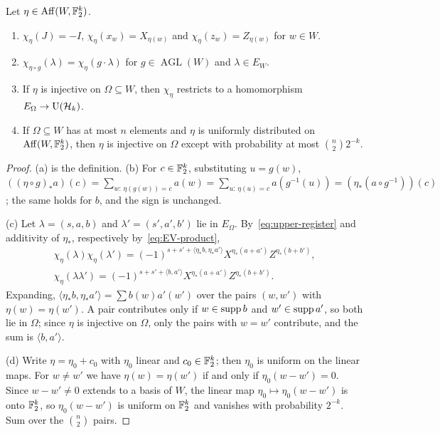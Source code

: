 \begin{lemma}\label{lem:pauli-hash}
Let $\eta\in\operatorname{Aff}(W,\mathbb F_2^k)$.
\begin{enumerate}[label=(\alph*),itemsep=1pt]
\item $\chi_\eta(J)=-I$, $\chi_\eta(x_w)=X_{\eta(w)}$ and $\chi_\eta(z_w)=Z_{\eta(w)}$ for $w\in W$.
\item $\chi_{\eta\circ g}(\lambda)=\chi_\eta(g\cdot\lambda)$ for $g\in\operatorname{AGL}(W)$ and $\lambda\in E_W$.
\item If $\eta$ is injective on $\Omega\subseteq W$, then $\chi_\eta$ restricts to a homomorphism $E_\Omega\to\mathrm U(\mathcal H_k)$.
\item If $\Omega\subseteq W$ has at most $n$ elements and $\eta$ is uniformly distributed on $\operatorname{Aff}(W,\mathbb F_2^k)$, then $\eta$ is
injective on $\Omega$ except with probability at most $\binom n2 2^{-k}$.
\end{enumerate}
\end{lemma}

\begin{proof}
(a) is the definition. (b) For $c\in\mathbb F_2^k$, substituting $u=g(w)$,
$((\eta\circ g)_*a)(c)=\sum_{w:\,\eta(g(w))=c}a(w)=\sum_{u:\,\eta(u)=c}a(g^{-1}(u))=(\eta_*(a\circ g^{-1}))(c)$; the same holds for $b$, and the
sign is unchanged.

(c) Let $\lambda=(s,a,b)$ and $\lambda'=(s',a',b')$ lie in $E_\Omega$. By~\eqref{eq:upper-register} and additivity of $\eta_*$, respectively
by~\eqref{eq:EV-product},
\begin{gather*}
\chi_\eta(\lambda)\chi_\eta(\lambda')=(-1)^{s+s'+\langle\eta_*b,\eta_*a'\rangle}X^{\eta_*(a+a')}Z^{\eta_*(b+b')},\\
\chi_\eta(\lambda\lambda')=(-1)^{s+s'+\langle b,a'\rangle}X^{\eta_*(a+a')}Z^{\eta_*(b+b')}.
\end{gather*}
Expanding, $\langle\eta_*b,\eta_*a'\rangle=\sum b(w)a'(w')$ over the pairs $(w,w')$ with $\eta(w)=\eta(w')$. A pair contributes only if
$w\in\operatorname{supp} b$ and $w'\in\operatorname{supp} a'$, so both lie in $\Omega$; since $\eta$ is injective on $\Omega$, only the pairs with $w=w'$ contribute,
and the sum is $\langle b,a'\rangle$.

(d) Write $\eta=\eta_0+c_0$ with $\eta_0$ linear and $c_0\in\mathbb F_2^k$; then $\eta_0$ is uniform on the linear maps. For $w\ne w'$ we have
$\eta(w)=\eta(w')$ if and only if $\eta_0(w-w')=0$. Since $w-w'\ne0$ extends to a basis of $W$, the linear map $\eta_0\mapsto\eta_0(w-w')$
is onto $\mathbb F_2^k$, so $\eta_0(w-w')$ is uniform on $\mathbb F_2^k$ and vanishes with probability $2^{-k}$. Sum over the $\binom n2$ pairs.
\end{proof}

